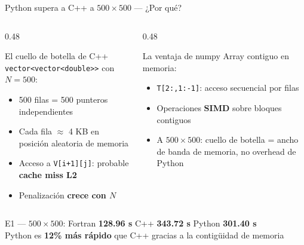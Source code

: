 \documentclass[aspectratio=169, 11pt]{beamer}
\begin{document}
\begin{frame}{Python supera a C++ a $500\times500$ — ¿Por qué?}
  \begin{columns}[T]
    \begin{column}{0.48\textwidth}
      \begin{alertblock}{El cuello de botella de C++}
        \texttt{vector<vector<double>>} con $N=500$:
        \begin{itemize}
          \item 500 filas = 500 punteros independientes
          \item Cada fila $\approx$ 4 KB en posición aleatoria de memoria
          \item Acceso a \texttt{V[i+1][j]}: probable \textbf{cache miss L2}
          \item Penalización \textbf{crece con $N$}
        \end{itemize}
      \end{alertblock}
    \end{column}
    \begin{column}{0.48\textwidth}
      \begin{exampleblock}{La ventaja de numpy}
        Array contiguo en memoria:
        \begin{itemize}
          \item \texttt{T[2:,1:-1]}: acceso secuencial por filas
          \item Operaciones \textbf{SIMD} sobre bloques contiguos
          \item A $500\times500$: cuello de botella = ancho de banda de memoria, no overhead de Python
        \end{itemize}
      \end{exampleblock}
    \end{column}
  \end{columns}
  \vspace{0.3cm}
  \begin{center}
  \begin{block}{}
    \centering
    E1 — $500\times500$: \quad
    Fortran \textbf{128.96 s} \quad
    C++ \textcolor{rojok}{\textbf{343.72 s}} \quad
    Python \textcolor{verdek}{\textbf{301.40 s}}\\[0.1cm]
    {\small Python es \textbf{12\% más rápido} que C++ gracias a la contigüidad de memoria}
  \end{block}
  \end{center}
\end{frame}
\end{document}
